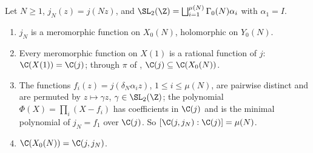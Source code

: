\begin{proposition}\label{prop:modforms:function-field}
Let $N\ge1$, $j_N(z)=j(Nz)$, and $\SL_2(\Z)=\bigsqcup_{i=1}^{\mu(N)}\Gamma_0(N)\alpha_i$ with $\alpha_1=I$.
\begin{enumerate}[label=(\roman*)]
\item $j_N$ is a meromorphic function on $X_0(N)$, holomorphic on $Y_0(N)$.
\item Every meromorphic function on $X(1)$ is a rational function of $j$: $\C(X(1))=\C(j)$; through $\pi$ of , $\C(j)\subseteq\C(X_0(N))$.
\item The functions $f_i(z)=j(\delta_N\alpha_iz)$, $1\le i\le\mu(N)$, are pairwise distinct and are permuted by $z\mapsto\gamma z$, $\gamma\in\SL_2(\Z)$; the polynomial
$\Phi(X)=\prod_i(X-f_i)$ has coefficients in $\C(j)$ and is the minimal polynomial of $j_N=f_1$ over $\C(j)$. So $[\C(j,j_N):\C(j)]=\mu(N)$.
\item $\C(X_0(N))=\C(j,j_N)$.
\end{enumerate}
\end{proposition}

